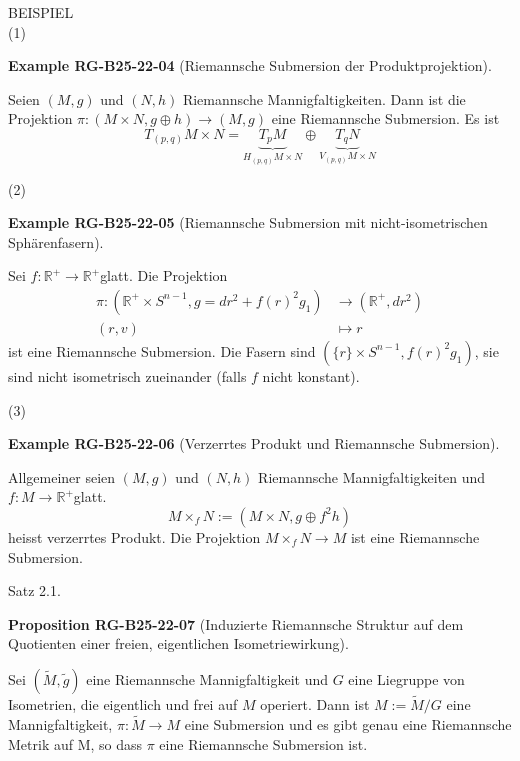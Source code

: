 \documentclass[10pt, letterpaper]{article}
\newcommand{\CustomHeading}[3]{%
  \par\medskip\noindent%
  \textbf{#1 #2} \textnormal{(#3)}.\enskip%
}
\newenvironment{PROP}[2]{\begin{unitbox}\CustomHeading{Proposition}{#1}{#2}}{\end{unitbox}}
\newenvironment{EXA}[2]{\begin{unitbox}\CustomHeading{Example}{#1}{#2}}{\end{unitbox}}
\begin{document}
BEISPIEL\\


(1) 

\begin{EXA}{RG-B25-22-04}{Riemannsche Submersion der Produktprojektion}
Seien $(M, g)$ und $(N, h)$ Riemannsche Mannigfaltigkeiten. Dann ist die Projektion $\pi:(M \times N, g \oplus h) \rightarrow(M, g)$ eine Riemannsche Submersion. Es ist
$$
T_{(p, q)} M \times N=\underbrace{T_{p} M}_{H_{(p, q)} M \times N} \oplus \underbrace{T_{q} N}_{V_{(p, q)} M \times N}
$$
\end{EXA}


(2) 

\begin{EXA}{RG-B25-22-05}{Riemannsche Submersion mit nicht-isometrischen Sphärenfasern}
Sei $f: \mathbb{R}^{+} \rightarrow \mathbb{R}^{+}$glatt. Die Projektion
$$
\begin{aligned}
\pi:\left(\mathbb{R}^{+} \times S^{n-1}, g=d r^{2}+f(r)^{2} g_{1}\right) & \rightarrow\left(\mathbb{R}^{+}, d r^{2}\right) \\
(r, v) & \mapsto r
\end{aligned}
$$
ist eine Riemannsche Submersion. Die Fasern sind $\left(\{r\} \times S^{n-1}, f(r)^{2} g_{1}\right)$, sie sind nicht isometrisch zueinander (falls $f$ nicht konstant).
\end{EXA}


(3) 

\begin{EXA}{RG-B25-22-06}{Verzerrtes Produkt und Riemannsche Submersion}
Allgemeiner seien $(M, g)$ und $(N, h)$ Riemannsche Mannigfaltigkeiten und $f: M \rightarrow \mathbb{R}^{+}$glatt.
$$
M \times_{f} N:=\left(M \times N, g \oplus f^{2} h\right)
$$
heisst verzerrtes Produkt. Die Projektion $M \times_{f} N \rightarrow M$ ist eine Riemannsche Submersion.
\end{EXA}



Satz 2.1. 


\begin{PROP}{RG-B25-22-07}{Induzierte Riemannsche Struktur auf dem Quotienten einer freien, eigentlichen Isometriewirkung}
Sei $(\tilde{M}, \tilde{g})$ eine Riemannsche Mannigfaltigkeit und $G$ eine Liegruppe von Isometrien, die eigentlich und frei auf $M$ operiert. Dann ist $M:=\tilde{M} / G$ eine Mannigfaltigkeit, $\pi: \tilde{M} \rightarrow M$ eine Submersion und es gibt genau eine Riemannsche Metrik auf M, so dass $\pi$ eine Riemannsche Submersion ist.
\end{PROP}
\end{document}
